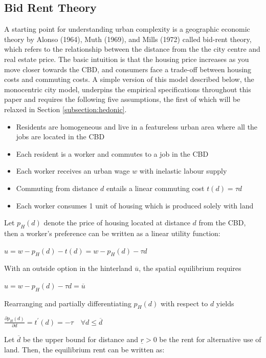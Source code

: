 \documentclass{article}
\begin{document}
\subsection{Bid Rent Theory} \label{subsection:monocentric}
A starting point for understanding urban complexity is a geographic economic theory by Alonso (1964), Muth (1969), and Mills (1972) called bid-rent theory, which refers to the relationship between the distance from the the city centre and real estate price. The basic intuition is that the housing price increases as you move closer towards the CBD, and consumers face a trade-off between housing costs and commuting costs. A simple version of this model described below, the monocentric city model, underpins the empirical specifications throughout this paper and requires the following five assumptions, the first of which will be relaxed in Section \ref{subsection:hedonic}.
\begin{itemize}
\setlength\itemsep{0.1em}
\item Residents are homogeneous and live in a featureless urban area where all the jobs are located in the CBD
\item Each resident is a worker and commutes to a job in the CBD
\item Each worker receives an urban wage $w$ with inelastic labour supply
\item Commuting from distance $d$ entails a linear commuting cost $t(d) = \tau d$
\item Each worker consumes 1 unit of housing which is produced solely  with land
\end{itemize}
Let $p_H (d)$ denote the price of housing located at distance $d$ from the CBD, then a worker's preference can be written as a linear utility function:
\begin{center}
$u = w - p _ { H } ( d ) - t ( d ) = w - p _ { H } ( d ) - \tau d$
\end{center}
With an outside option in the hinterland $\overline{u}$, the spatial equilibrium requires
\begin{center}
$u = w - p _ { H } ( d ) - \tau d = \overline { u }$
\end{center}
Rearranging and partially differentiating $p_H (d)$ with respect to $d$ yields 
\begin{center}
$\frac { \partial p _ { H } ( d ) } { \partial d } = t ^ { \prime } ( d ) = - \tau \quad \forall d \leq \overline { d }$
\end{center}
Let $\overline{d}$ be the upper bound for distance and $\underline{r} > 0$ be the rent for alternative use of land. Then, the equilibrium rent can be written as:
\end{document}
